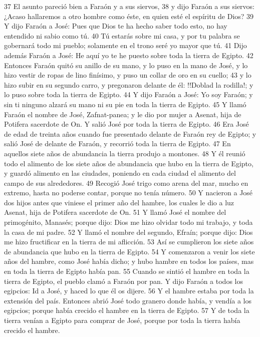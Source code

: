 37 El asunto pareció bien a Faraón y a sus siervos,
38 y dijo Faraón a sus siervos: ¿Acaso hallaremos a otro hombre como éste, en quien esté el espíritu de Dios?
39 Y dijo Faraón a José: Pues que Dios te ha hecho saber todo esto, no hay entendido ni sabio como tú.
40 Tú estarás sobre mi casa, y por tu palabra se gobernará todo mi pueblo; solamente en el trono seré yo mayor que tú.
41 Dijo además Faraón a José: He aquí yo te he puesto sobre toda la tierra de Egipto.
42 Entonces Faraón quitó su anillo de su mano, y lo puso en la mano de José, y lo hizo vestir de ropas de lino finísimo, y puso un collar de oro en su cuello;
43 y lo hizo subir en su segundo carro, y pregonaron delante de él: !!Doblad la rodilla!; y lo puso sobre toda la tierra de Egipto.
44 Y dijo Faraón a José: Yo soy Faraón; y sin ti ninguno alzará su mano ni su pie en toda la tierra de Egipto.
45 Y llamó Faraón el nombre de José, Zafnat-panea; y le dio por mujer a Asenat, hija de Potifera sacerdote de On. Y salió José por toda la tierra de Egipto.
46 Era José de edad de treinta años cuando fue presentado delante de Faraón rey de Egipto; y salió José de delante de Faraón, y recorrió toda la tierra de Egipto.
47 En aquellos siete años de abundancia la tierra produjo a montones.
48 Y él reunió todo el alimento de los siete años de abundancia que hubo en la tierra de Egipto, y guardó alimento en las ciudades, poniendo en cada ciudad el alimento del campo de sus alrededores.
49 Recogió José trigo como arena del mar, mucho en extremo, hasta no poderse contar, porque no tenía número.
50 Y nacieron a José dos hijos antes que viniese el primer año del hambre, los cuales le dio a luz Asenat, hija de Potifera sacerdote de On.
51 Y llamó José el nombre del primogénito, Manasés; porque dijo: Dios me hizo olvidar todo mi trabajo, y toda la casa de mi padre.
52 Y llamó el nombre del segundo, Efraín; porque dijo: Dios me hizo fructificar en la tierra de mi aflicción.
53 Así se cumplieron los siete años de abundancia que hubo en la tierra de Egipto.
54 Y comenzaron a venir los siete años del hambre, como José había dicho; y hubo hambre en todos los países, mas en toda la tierra de Egipto había pan.
55 Cuando se sintió el hambre en toda la tierra de Egipto, el pueblo clamó a Faraón por pan. Y dijo Faraón a todos los egipcios: Id a José, y haced lo que él os dijere.
56 Y el hambre estaba por toda la extensión del país. Entonces abrió José todo granero donde había, y vendía a los egipcios; porque había crecido el hambre en la tierra de Egipto.
57 Y de toda la tierra venían a Egipto para comprar de José, porque por toda la tierra había crecido el hambre.

